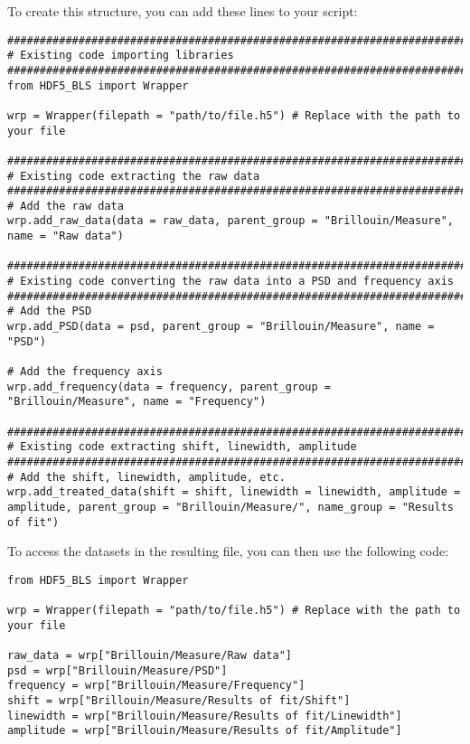 To create this structure, you can add these lines to your script:
\begin{lstlisting}
###############################################################################
# Existing code importing libraries
###############################################################################
from HDF5_BLS import Wrapper

wrp = Wrapper(filepath = "path/to/file.h5") # Replace with the path to your file

###############################################################################
# Existing code extracting the raw data
###############################################################################
# Add the raw data
wrp.add_raw_data(data = raw_data, parent_group = "Brillouin/Measure", name = "Raw data")

###############################################################################
# Existing code converting the raw data into a PSD and frequency axis
###############################################################################
# Add the PSD
wrp.add_PSD(data = psd, parent_group = "Brillouin/Measure", name = "PSD")

# Add the frequency axis
wrp.add_frequency(data = frequency, parent_group = "Brillouin/Measure", name = "Frequency")

###############################################################################
# Existing code extracting shift, linewidth, amplitude
###############################################################################
# Add the shift, linewidth, amplitude, etc.
wrp.add_treated_data(shift = shift, linewidth = linewidth, amplitude = amplitude, parent_group = "Brillouin/Measure/", name_group = "Results of fit")
\end{lstlisting}

To access the datasets in the resulting file, you can then use the following code:
\begin{lstlisting}
from HDF5_BLS import Wrapper

wrp = Wrapper(filepath = "path/to/file.h5") # Replace with the path to your file

raw_data = wrp["Brillouin/Measure/Raw data"]
psd = wrp["Brillouin/Measure/PSD"]
frequency = wrp["Brillouin/Measure/Frequency"]
shift = wrp["Brillouin/Measure/Results of fit/Shift"]
linewidth = wrp["Brillouin/Measure/Results of fit/Linewidth"]
amplitude = wrp["Brillouin/Measure/Results of fit/Amplitude"]
\end{lstlisting}

